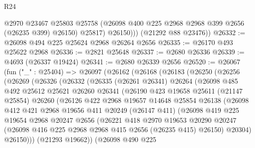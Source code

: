 \begin{lexlean}{R24}
\begin{coremodule}
              @2970
              @23467
              @25803
              @25758
              (@26098 @400 @225 @2968 @2968 @399 @2656 (@26235 @399) @26150)
              @25817)
            @26150)))
      (@21292 @88 @23476))
@26332 := @26098 @494 @225 @25624 @2968 @26264 @2656
@26335 := @26170 @493 @25622 @2968
@26336 := @2821 @25648
@26337 := @2680 @26336
@26339 := @4693 (@26337 @19424)
@26341 := @2680 @26339 @2656
@26520 := @26067
    (fun ("_" : @25404) =>
    @26097
      (@26162
        (@26168
          (@26183
            (@26250
              (@26256
                (@26269
                  (@26326
                    (@26332
                      (@26335
                        (@26261 @26341)
                        @26264
                        (@26098
                          @485
                          @492
                          @25612
                          @25621
                          @26260
                          @26341
                          (@26190
                            @423
                            @19658
                            @25611
                            (@21147 @25854)
                            @26260
                            (@26126
                              @422
                              @2968
                              @19657
                              @14648
                              @25854
                              @26138
                              (@26098
                                @412
                                @421
                                @2968
                                @19656
                                @411
                                @20249
                                (@26147 @411)
                                (@26098
                                  @419
                                  @225
                                  @19654
                                  @2968
                                  @20247
                                  @2656
                                  (@26221
                                    @418
                                    @2970
                                    @19653
                                    @20290
                                    @20247
                                    (@26098 @416 @225 @2968 @2968 @415 @2656 (@26235 @415) @26150)
                                    @20304)
                                  @26150)))
                            (@21293 @19662))
                          (@26098
                            @490
                            @225

\end{coremodule}
\end{lexlean}
